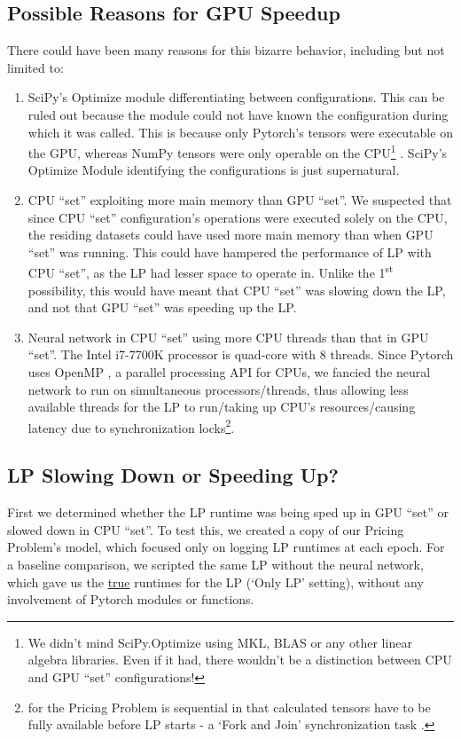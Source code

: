 \begin{appendices}
    \subsection{Possible Reasons for GPU Speedup} \label{app:Possible Reasons for GPU Speedup}
    There could have been many reasons for this bizarre behavior, including but not limited to:
    \begin{enumerate}
        \item SciPy's Optimize module differentiating between configurations. This can be ruled out because the module could not have known the configuration during which it was called. This is because only Pytorch's tensors were executable on the GPU, whereas NumPy tensors were only operable on the CPU\footnote{We didn't mind SciPy.Optimize using MKL, BLAS or any other linear algebra libraries. Even if it had, there wouldn't be a distinction between CPU and GPU ``set'' configurations!} \cite{PTDocs,NPDocs,SCPOptimizeDocs}. SciPy's Optimize Module identifying the configurations is just supernatural.
        \item CPU ``set'' exploiting more main memory than GPU ``set''. We suspected that since CPU ``set'' configuration's operations were executed solely on the CPU, the residing datasets could have used more main memory than when GPU ``set'' was running. This could have hampered the performance of LP with CPU ``set'', as the LP had lesser space to operate in. Unlike the 1\textsuperscript{st} possibility, this would have meant that CPU ``set'' was slowing down the LP, and not that GPU ``set'' was speeding up the LP.
        \item Neural network in CPU ``set'' using more CPU threads than that in GPU ``set''. The Intel i7-7700K processor is quad-core with 8 threads. Since Pytorch uses OpenMP \cite{PTDocs,OpenMP}, a parallel processing API for CPUs, we fancied the neural network to run on simultaneous processors/threads, thus allowing less available threads for the LP to run/taking up CPU's resources/causing latency due to synchronization locks\footnote{ for the Pricing Problem is sequential in that calculated tensors have to be fully available before LP starts - a `Fork and Join' synchronization task \cite[Section 2.2]{IssuesMP}.}.
    \end{enumerate}

    \subsection{LP Slowing Down or Speeding Up?} \label{app:LP Slowing Down or Speeding Up?}
    First we determined whether the LP runtime was being sped up in GPU ``set'' or slowed down in CPU ``set''. To test this, we created a copy of our Pricing Problem's model, which focused only on logging LP runtimes at each epoch. For a baseline comparison, we scripted the same LP without the neural network, which gave us the \underline{true} runtimes for the LP (`Only LP' setting), without any involvement of Pytorch modules or functions. 
    

\end{appendices}
